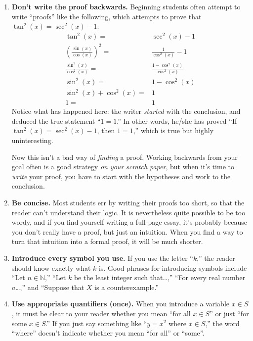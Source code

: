 \begin{enumerate}
\item \textbf{Don't write the proof backwards.} Beginning students often attempt to write ``proofs'' like the following, which attempts to prove that $\tan^2(x)  = \sec^2(x) - 1$:
\begin{align*}
\tan^2(x) =& \sec^2(x) - 1 \\
\left(\frac{\sin(x)}{\cos(x)}\right)^2 =& \frac{1}{\cos^2(x)} - 1 \\
\frac{\sin^2(x)}{\cos^2(x)} =&  \frac{1-\cos^2(x)}{\cos^2(x)} \\
\sin^2(x) =& 1-\cos^2(x) \\
\sin^2(x) + \cos^2(x) =& 1 \\
1 =& 1
\end{align*}
Notice what has happened here:  the writer \emph{started} with the conclusion, and deduced the true statement ``$1=1$.'' In other words, he/she has proved ``If $\tan^2(x) = \sec^2(x) - 1$, then $1=1$,'' which is true but highly uninteresting.

Now this isn't a bad way of \emph{finding} a proof.
Working backwards from your goal often is a good strategy \emph{on your scratch paper},
but when it's time to \emph{write} your proof,
you have to start with the hypotheses and work to the conclusion.

\item \textbf{Be concise.} Most students err by writing their proofs too short, so that the reader can't understand their logic. It is nevertheless quite possible to be too wordy, and if you find yourself writing a full-page essay, it's probably because you don't really have a proof, but just an intuition. When you find a way to turn that intuition into a formal proof, it will be much shorter.

\item \textbf{Introduce every symbol you use.} If you use the letter ``$k$,'' the reader should know exactly what $k$ is. Good phrases for introducing symbols include ``Let $n\in \mathbb{N}$,'' ``Let $k$ be the least integer such that\ldots,'' ``For every real number $a$\ldots,'' and ``Suppose that $X$ is a counterexample.''
  
\item \textbf{Use appropriate quantifiers (once).} When you introduce a variable $x\in S$, it must be clear to your reader whether you mean ``for all $x\in S$'' or just ``for some $x\in S$.'' If you just say something like ``$y=x^2$ where $x\in S$,'' the word ``where'' doesn't indicate whether you mean ``for all'' or ``some''.


\end{enumerate}
